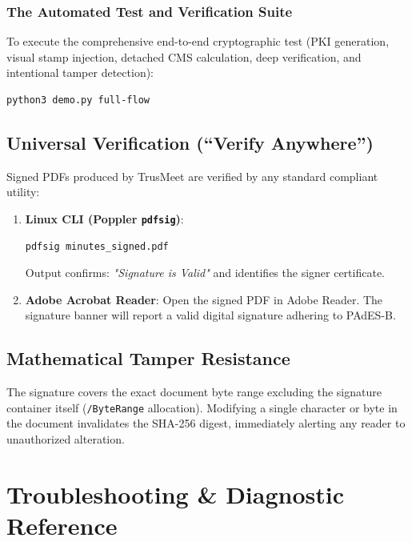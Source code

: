 \documentclass[11pt,a4paper]{report}
\begin{document}
\subsection{The Automated Test and Verification Suite}
To execute the comprehensive end-to-end cryptographic test (PKI generation, visual stamp injection, detached CMS calculation, deep verification, and intentional tamper detection):
\begin{lstlisting}[language=bash]
python3 demo.py full-flow
\end{lstlisting}

\section{Universal Verification (``Verify Anywhere'')}
Signed PDFs produced by TrusMeet are verified by any standard compliant utility:
\begin{enumerate}
    \item \textbf{Linux CLI (Poppler \texttt{pdfsig})}:
\begin{lstlisting}[language=bash]
pdfsig minutes_signed.pdf
\end{lstlisting}
Output confirms: \textit{"Signature is Valid"} and identifies the signer certificate.
    \item \textbf{Adobe Acrobat Reader}:
    Open the signed PDF in Adobe Reader. The signature banner will report a valid digital signature adhering to PAdES-B.
\end{enumerate}

\section{Mathematical Tamper Resistance}
The signature covers the exact document byte range excluding the signature container itself (\texttt{/ByteRange} allocation). Modifying a single character or byte in the document invalidates the SHA-256 digest, immediately alerting any reader to unauthorized alteration.

\newpage
\chapter{Troubleshooting \& Diagnostic Reference}
\end{document}
